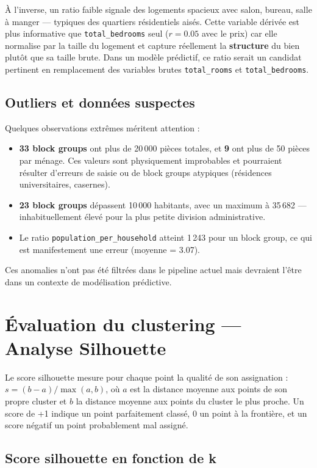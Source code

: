 \documentclass[11pt,a4paper]{article}
\begin{document}
À l'inverse, un ratio faible signale des logements spacieux avec salon, bureau, salle à manger --- typiques des quartiers résidentiels aisés. Cette variable dérivée est plus informative que \texttt{total\_bedrooms} seul ($r = 0.05$ avec le prix) car elle normalise par la taille du logement et capture réellement la \textbf{structure} du bien plutôt que sa taille brute. Dans un modèle prédictif, ce ratio serait un candidat pertinent en remplacement des variables brutes \texttt{total\_rooms} et \texttt{total\_bedrooms}.

\subsection{Outliers et données suspectes}

Quelques observations extrêmes méritent attention :

\begin{itemize}
    \item \textbf{33 block groups} ont plus de 20\,000 pièces totales, et \textbf{9} ont plus de 50 pièces par ménage. Ces valeurs sont physiquement improbables et pourraient résulter d'erreurs de saisie ou de block groups atypiques (résidences universitaires, casernes).
    \item \textbf{23 block groups} dépassent 10\,000 habitants, avec un maximum à 35\,682 --- inhabituellement élevé pour la plus petite division administrative.
    \item Le ratio \texttt{population\_per\_household} atteint 1\,243 pour un block group, ce qui est manifestement une erreur (moyenne = 3.07).
\end{itemize}

Ces anomalies n'ont pas été filtrées dans le pipeline actuel mais devraient l'être dans un contexte de modélisation prédictive.

\section{Évaluation du clustering --- Analyse Silhouette}

Le score silhouette mesure pour chaque point la qualité de son assignation : $s = (b - a) / \max(a, b)$, où $a$ est la distance moyenne aux points de son propre cluster et $b$ la distance moyenne aux points du cluster le plus proche. Un score de +1 indique un point parfaitement classé, 0 un point à la frontière, et un score négatif un point probablement mal assigné.

\subsection{Score silhouette en fonction de k}
\end{document}
